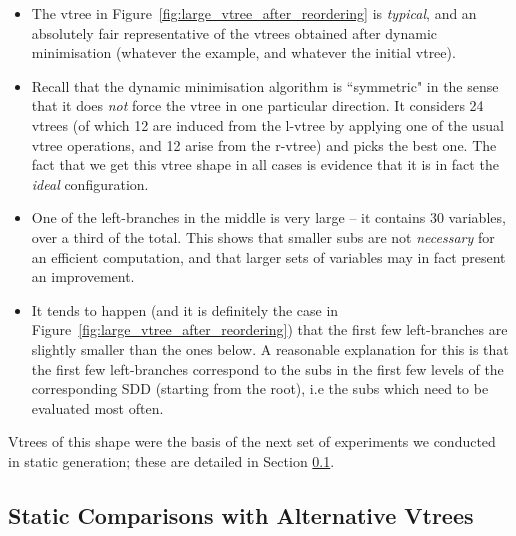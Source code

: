 \documentclass[11pt]{article}
\begin{document}
\begin{itemize}
\item The vtree in Figure~\ref{fig:large_vtree_after_reordering} is \textit{typical}, and an absolutely fair representative of the vtrees obtained after dynamic minimisation (whatever the example, and whatever the initial vtree).
\item Recall that the dynamic minimisation algorithm is ``symmetric" in the sense that it does \textit{not} force the vtree in one particular direction. It considers 24 vtrees (of which 12 are induced from the l-vtree by applying one of the usual vtree operations, and 12 arise from the r-vtree) and picks the best one. The fact that we get this vtree shape in all cases is evidence that it is in fact the \textit{ideal} configuration. 
\item One of the left-branches in the middle is very large -- it contains 30 variables, over a third of the total. This shows that smaller subs are not \textit{necessary }for an efficient computation, and that larger sets of variables may in fact present an improvement. 
\item It tends to happen (and it is definitely the case in Figure~\ref{fig:large_vtree_after_reordering}) that the first few left-branches are slightly smaller than the ones below. A reasonable explanation for this is that the first few left-branches correspond to the subs in the first few levels of the corresponding SDD (starting from the root), i.e the subs which need to be evaluated most often.
\end{itemize}
Vtrees of this shape were the basis of the next set of experiments we conducted in static generation; these are detailed in Section \ref{alternative}.


\subsection{Static Comparisons with Alternative Vtrees}
\label{alternative}
\end{document}
